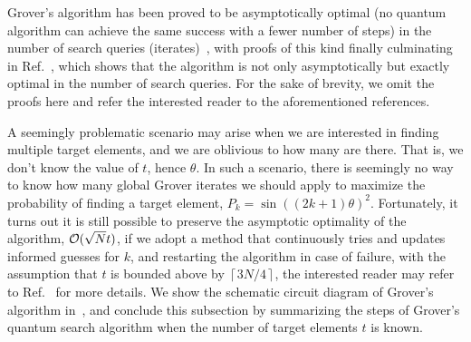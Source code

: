 \bigskip
\noindent
Grover's algorithm has been proved to be asymptotically optimal (no quantum algorithm can achieve the same success with a fewer number of steps) in the number of search queries (iterates)~\cite{Bennett_1997,Boyer_1998,Grover_1998}, with proofs of this kind finally culminating in Ref.~\cite{Zalka_1999}, which shows that the algorithm is not only asymptotically but exactly optimal in the number of search queries. For the sake of brevity, we omit the proofs here and refer the interested reader to the aforementioned references. 

\bigskip
\noindent
A seemingly problematic scenario may arise when we are interested in finding multiple target elements, and we are oblivious to how many are there. That is, we don't know the value of $t$, hence $\theta$. In such a scenario, there is seemingly no way to know how many global Grover iterates we should apply to maximize the probability of finding a target element, $P_k = \sin{((2k+1)\theta)}^2$. Fortunately, it turns out it is still possible to preserve the asymptotic optimality of the algorithm, $\mathcal{O}(\sqrt{N}{t})$, if we adopt a method that continuously tries and updates informed guesses for $k$, and restarting the algorithm in case of failure, with the assumption that $t$ is bounded above by $\left\lceil  3N/4 \right\rceil$, the interested reader may refer to Ref.~\cite{Boyer_1998} for more details. We show the schematic circuit diagram of Grover's algorithm in~, and conclude this subsection by summarizing the steps of Grover's quantum search algorithm when the number of target elements $t$ is known.

